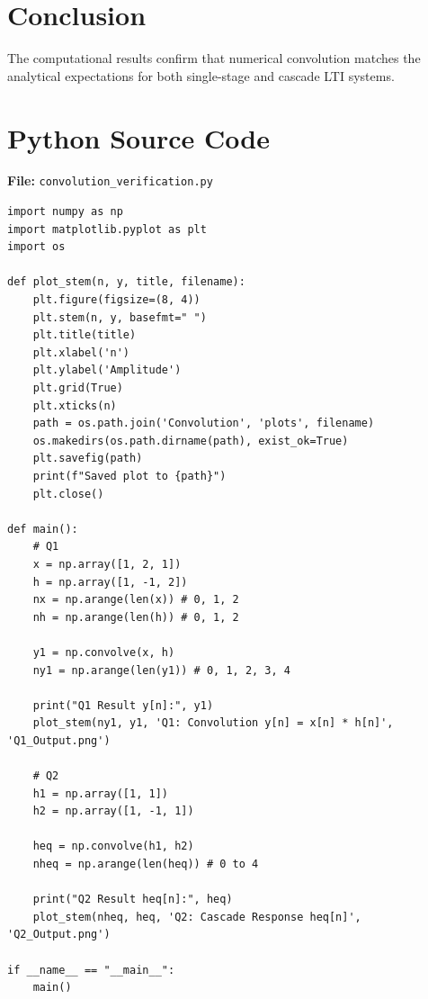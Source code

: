 \documentclass[11pt, a4paper]{article}
\begin{document}
\section{Conclusion}
The computational results confirm that numerical convolution matches the analytical expectations for both single-stage and cascade LTI systems.

\appendix
\section{Python Source Code}
\textbf{File:} \texttt{convolution\_verification.py}
\begin{lstlisting}[caption={Discrete-Time Convolution Verification -- Assignment 3}]
import numpy as np
import matplotlib.pyplot as plt
import os

def plot_stem(n, y, title, filename):
    plt.figure(figsize=(8, 4))
    plt.stem(n, y, basefmt=" ")
    plt.title(title)
    plt.xlabel('n')
    plt.ylabel('Amplitude')
    plt.grid(True)
    plt.xticks(n)
    path = os.path.join('Convolution', 'plots', filename)
    os.makedirs(os.path.dirname(path), exist_ok=True)
    plt.savefig(path)
    print(f"Saved plot to {path}")
    plt.close()

def main():
    # Q1
    x = np.array([1, 2, 1])
    h = np.array([1, -1, 2])
    nx = np.arange(len(x)) # 0, 1, 2
    nh = np.arange(len(h)) # 0, 1, 2
    
    y1 = np.convolve(x, h)
    ny1 = np.arange(len(y1)) # 0, 1, 2, 3, 4
    
    print("Q1 Result y[n]:", y1)
    plot_stem(ny1, y1, 'Q1: Convolution y[n] = x[n] * h[n]', 'Q1_Output.png')

    # Q2
    h1 = np.array([1, 1])
    h2 = np.array([1, -1, 1])
    
    heq = np.convolve(h1, h2)
    nheq = np.arange(len(heq)) # 0 to 4
    
    print("Q2 Result heq[n]:", heq)
    plot_stem(nheq, heq, 'Q2: Cascade Response heq[n]', 'Q2_Output.png')

if __name__ == "__main__":
    main()
\end{lstlisting}
\end{document}
